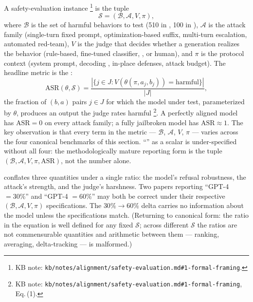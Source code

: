 A safety-evaluation instance%
\footnote{KB note: \nolinkurl{kb/notes/alignment/safety-evaluation.md#1-formal-framing}.}
is the tuple
\[
\mathcal{S} = (\mathcal{B}, \mathcal{A}, V, \pi),
\]
where $\mathcal{B}$ is the set of harmful behaviors to test (510 in
, 100 in ), $\mathcal{A}$ is the attack family
(single-turn fixed prompt, optimization-based suffix, multi-turn
escalation, automated red-team), $V$ is the judge that decides
whether a generation realizes the behavior (rule-based, fine-tuned
classifier, , or human), and $\pi$ is the protocol
context (system prompt, decoding , in-place defenses,
attack budget). The headline metric is the 
\citep[\S{}abstract]{chao2024-jailbreakbench}:
\[
\mathrm{ASR}(\theta, \mathcal{S}) =
\frac{|\{j \in J : V(\theta(\pi, a_j, b_j)) = \text{harmful}\}|}{|J|},
\]
the fraction of $(b, a)$ pairs $j \in J$ for which the model under
test, parameterized by $\theta$, produces an output the judge rates
harmful%
\footnote{KB note: \nolinkurl{kb/notes/alignment/safety-evaluation.md#1-formal-framing}, Eq.\,(1).}.
A perfectly aligned model has $\mathrm{ASR} = 0$ on every attack
family; a fully jailbroken model has $\mathrm{ASR} \approx 1$. The
key observation is that every term in the metric ---
$\mathcal{B}$, $\mathcal{A}$, $V$, $\pi$ --- varies across the four
canonical benchmarks of this section. ``'' as a scalar is
under-specified without all four: the methodologically mature
reporting form is the tuple $(\mathcal{B}, \mathcal{A}, V, \pi,
\mathrm{ASR})$, not the number alone.

\begin{intuition}
 conflates three quantities under a single ratio: the model's
refusal robustness, the attack's strength, and the judge's
harshness. Two papers reporting ``GPT-4  $= 30\%$'' and ``GPT-4
 $= 60\%$'' may both be correct under their respective
$(\mathcal{B}, \mathcal{A}, V, \pi)$ specifications. The $30\%
\to 60\%$ delta carries no information about the model unless the
specifications match. (Returning to canonical form: the ratio in
the  equation is well defined for any fixed $\mathcal{S}$;
across different $\mathcal{S}$ the ratios are not commensurable
quantities and arithmetic between them --- ranking, averaging,
delta-tracking --- is malformed.)
\end{intuition}

